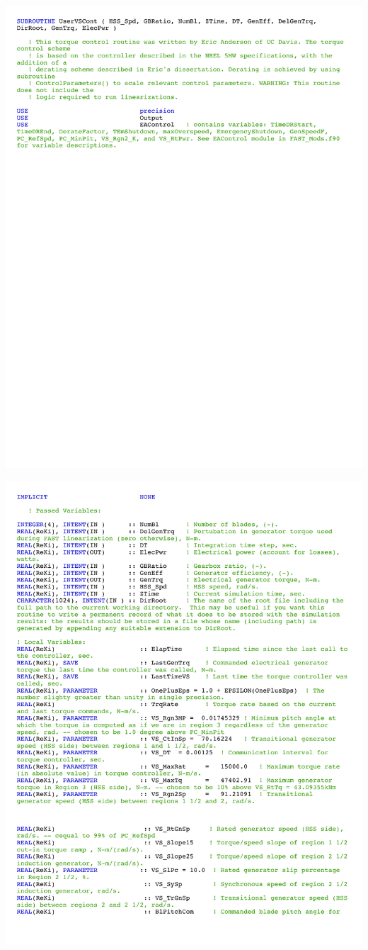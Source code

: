 \noindent
\includegraphics[width=\linewidth]{Figures/AppendixDFigures/figD-2A.pdf}

\noindent
\includegraphics[width=\linewidth]{Figures/AppendixDFigures/figD-2B.pdf}

